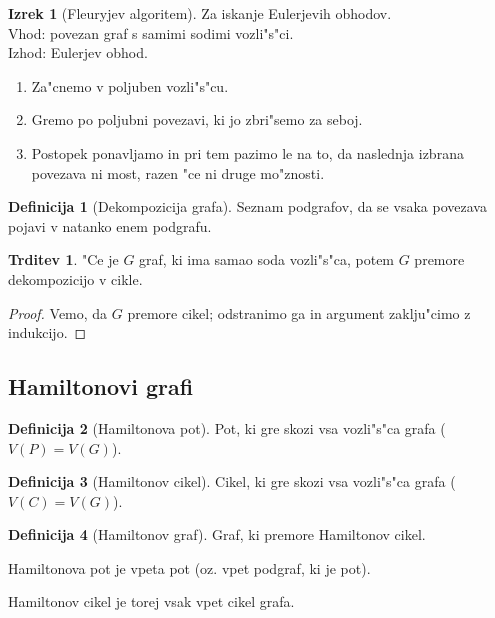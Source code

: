 \documentclass{article}
\theoremstyle{definition}
\newtheorem{definition}{Definicija}[section]
\newtheorem{claim}{Trditev}[section]
\newtheorem{theorem}{Izrek}[section]
\begin{document}
	\begin{theorem}[Fleuryjev algoritem]
		Za iskanje Eulerjevih obhodov. \\
		Vhod: povezan graf s samimi sodimi vozli"s"ci. \\
		Izhod: Eulerjev obhod.
		\begin{enumerate}
			\item Za"cnemo v poljuben vozli"s"cu.
			\item Gremo po poljubni povezavi, ki jo zbri"semo za seboj.
			\item Postopek ponavljamo in pri tem pazimo le na to, da naslednja izbrana povezava ni most, razen "ce ni druge mo"znosti.
		\end{enumerate}
	\end{theorem}

	\begin{definition}[Dekompozicija grafa]
		Seznam podgrafov, da se vsaka povezava pojavi v natanko enem podgrafu.
	\end{definition}

	\begin{claim}
		"Ce je $G$ graf, ki ima samao soda vozli"s"ca, potem $G$ premore dekompozicijo v cikle.	
		\begin{proof}
			Vemo, da $G$ premore cikel; odstranimo ga in argument zaklju"cimo z indukcijo.
		\end{proof}
	\end{claim}

	\subsection{Hamiltonovi grafi}
	\begin{definition}[Hamiltonova pot]
		Pot, ki gre skozi vsa vozli"s"ca grafa ($V(P) = V(G)$).
	\end{definition}

	\begin{definition}[Hamiltonov cikel]
		Cikel, ki gre skozi vsa vozli"s"ca grafa ($V(C) = V(G)$).
	\end{definition}
	
	\begin{definition}[Hamiltonov graf]
		Graf, ki premore Hamiltonov cikel.
	\end{definition}

	Hamiltonova pot je vpeta pot (oz. vpet podgraf, ki je pot).
	
	Hamiltonov cikel je torej vsak vpet cikel grafa.
	
\end{document}
